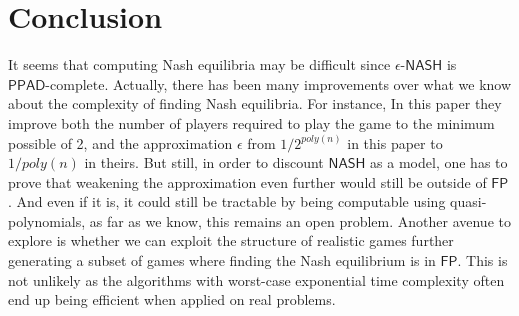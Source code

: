 \documentclass[11pt]{article}
\newcommand{\FP}{\mathsf{FP}}
\newcommand{\PPADc}{\mathsf{PPAD}\text{-complete}}
\newcommand{\NASH}{\mathsf{NASH}}
\newcommand{\eNASH}{\mathsf{\text{$\epsilon$-}NASH}}
\begin{document}
    

\section{Conclusion}
It seems that computing Nash equilibria may be difficult since $\eNASH$ is $\PPADc$. Actually, there has been many improvements over what we know about the complexity of finding Nash equilibria. For instance, In this paper \cite{chen2007settling} they improve both the number of players required to play the game to the minimum possible of 2, and the approximation $\epsilon$ from $1/2^{poly(n)}$ in this paper to $1/poly(n)$ in theirs. But still, in order to discount $\NASH$ as a model, one has to prove that weakening the approximation even further would still be outside of $\FP$. And even if it is, it could still be tractable by being computable using quasi-polynomials, as far as we know, this remains an open problem. Another avenue to explore is whether we can exploit the structure of realistic games further generating a subset of games where finding the Nash equilibrium is in $\FP$. This is not unlikely as the algorithms with worst-case exponential time complexity often end up being efficient when applied on real problems.
\end{document}

